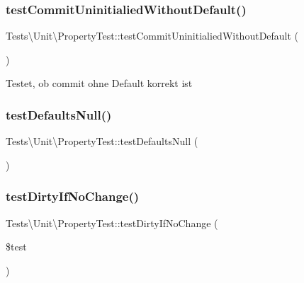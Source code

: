 \subsubsection{\texorpdfstring{test\+Commit\+Uninitialied\+Without\+Default()}{testCommitUninitialiedWithoutDefault()}}
{\footnotesize\ttfamily Tests\textbackslash{}\+Unit\textbackslash{}\+Property\+Test\+::test\+Commit\+Uninitialied\+Without\+Default (\begin{DoxyParamCaption}{ }\end{DoxyParamCaption})}

Testet, ob commit ohne Default korrekt ist   \mbox{\label{classTests_1_1Unit_1_1PropertyTest_a4a56adcd2b4034a7e746086d4af7f5d8}} 
\subsubsection{\texorpdfstring{test\+Defaults\+Null()}{testDefaultsNull()}}
{\footnotesize\ttfamily Tests\textbackslash{}\+Unit\textbackslash{}\+Property\+Test\+::test\+Defaults\+Null (\begin{DoxyParamCaption}{ }\end{DoxyParamCaption})}

\mbox{\label{classTests_1_1Unit_1_1PropertyTest_a27fad9dd59e460ee1f6c95c2c3b0372d}} 
\subsubsection{\texorpdfstring{test\+Dirty\+If\+No\+Change()}{testDirtyIfNoChange()}}
{\footnotesize\ttfamily Tests\textbackslash{}\+Unit\textbackslash{}\+Property\+Test\+::test\+Dirty\+If\+No\+Change (\begin{DoxyParamCaption}\item[{}]{\$test }\end{DoxyParamCaption})}

